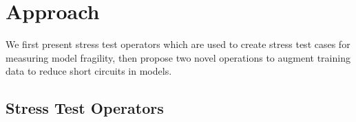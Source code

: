 \section{Approach}

We first present stress test operators which are used to create stress 
test cases for measuring model fragility,
then propose two novel operations to augment training data to 
reduce short circuits in models.

\subsection{Stress Test Operators}
 \label{sec:stressop}



